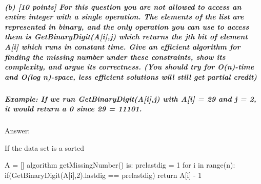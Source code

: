 \documentclass[
]{article}
\newenvironment{Shaded}{}{}
\newcommand{\NormalTok}[1]{#1}
\begin{document}
\hypertarget{b-10-points-for-this-question-you-are-not-allowed-to-access-an-entire-integer-with-a-single-operation-the-elements-of-the-list-are-represented-in-binary-and-the-only-operation-you-can-use-to-access-them-is-getbinarydigitaij-which-returns-the-jth-bit-of-element-ai-which-runs-in-constant-time-give-an-efficient-algorithm-for-finding-the-missing-number-under-these-constraints-show-its-complexity-and-argue-its-correctness-you-should-try-for-on-time-and-olog-n-space-less-efficient-solutions-will-still-get-partial-credit}{%
\subparagraph{(b) {[}10 points{]} For this question you are not allowed
to access an entire integer with a single operation. The elements of the
list are represented in binary, and the only operation you can use to
access them is GetBinaryDigit(A{[}i{]},j) which returns the jth bit of
element A{[}i{]} which runs in constant time. Give an efficient
algorithm for finding the missing number under these constraints, show
its complexity, and argue its correctness. (You should try for O(n)-time
and O(log n)-space, less efficient solutions will still get partial
credit)}\label{b-10-points-for-this-question-you-are-not-allowed-to-access-an-entire-integer-with-a-single-operation-the-elements-of-the-list-are-represented-in-binary-and-the-only-operation-you-can-use-to-access-them-is-getbinarydigitaij-which-returns-the-jth-bit-of-element-ai-which-runs-in-constant-time-give-an-efficient-algorithm-for-finding-the-missing-number-under-these-constraints-show-its-complexity-and-argue-its-correctness-you-should-try-for-on-time-and-olog-n-space-less-efficient-solutions-will-still-get-partial-credit}}

\hypertarget{example-if-we-run-getbinarydigitaij-with-ai--29-and-j--2-it-would-return-a-0-since-29--11101}{%
\subparagraph{Example: If we run GetBinaryDigit(A{[}i{]},j) with
A{[}i{]} = 29 and j = 2, it would return a 0 since 29 =
11101.}\label{example-if-we-run-getbinarydigitaij-with-ai--29-and-j--2-it-would-return-a-0-since-29--11101}}

Answer:

If the data set is a sorted

\begin{Shaded}
\begin{Highlighting}[]
\NormalTok{A = []}
\NormalTok{algorithm getMissingNumber() is:}
\NormalTok{	prelastdig = 1}
\NormalTok{	for i in range(n):}
\NormalTok{		if(GetBinaryDigit(A[i],2).lastdig == prelastdig)}
\NormalTok{			return A[i] {-} 1}
\end{Highlighting}
\end{Shaded}
\end{document}
